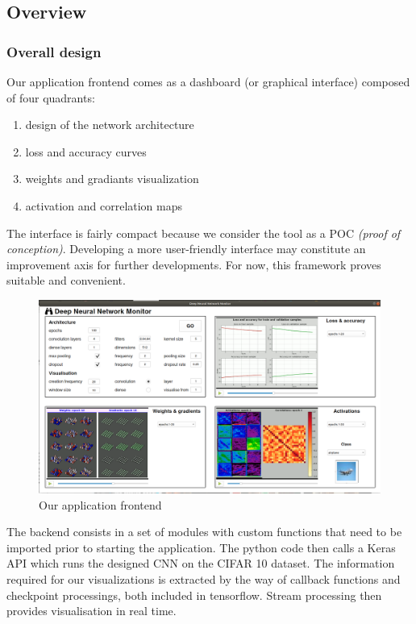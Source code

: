 \subsection{Overview}


\subsubsection{Overall design}


Our application frontend comes as a dashboard (or graphical interface) composed of four quadrants:

\begin{enumerate}
	\item design of the network architecture
	\item loss and accuracy curves
	\item weights and gradiants visualization
	\item activation and correlation maps
\end{enumerate} 

The interface is fairly compact because we consider the tool as a POC \emph{(proof of conception)}. Developing a more user-friendly interface may constitute an improvement axis for further developments. For now, this framework proves suitable and convenient. 

\begin{figure}[H]
	\centering
	\includegraphics[scale=0.32]{images/weights-grads-viewer/frontend.png}
	\caption{Our application frontend}
\end{figure}

The backend consists in a set of modules with custom functions that need to be imported prior to starting the application. The python code then calls a Keras API which runs the designed CNN on the CIFAR 10 dataset. The information required for our visualizations is extracted by the way of callback functions and checkpoint processings, both included in tensorflow. Stream processing then provides visualisation in real time.


